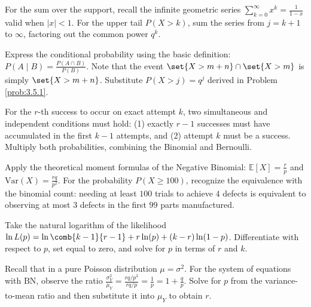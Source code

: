 \begin{sugerencia}
	\label{sug:3.5.1}
	For the sum over the support, recall the infinite geometric series $\sum_{k=0}^{\infty} x^k = \frac{1}{1-x}$ valid when $|x| < 1$. For the upper tail $P(X > k)$, sum the series from $j = k+1$ to $\infty$, factoring out the common power $q^k$.
\end{sugerencia}

\begin{sugerencia}
	\label{sug:3.5.2}
	Express the conditional probability using the basic definition: $P(A \mid B) = \frac{P(A \cap B)}{P(B)}$. Note that the event $\set{X > m+n} \cap \set{X > m}$ is simply $\set{X > m+n}$. Substitute $P(X > j) = q^j$ derived in Problem \ref{prob:3.5.1}.
\end{sugerencia}

\begin{sugerencia}
	\label{sug:3.5.3}
	For the $r$-th success to occur on exact attempt $k$, two simultaneous and independent conditions must hold: (1) exactly $r-1$ successes must have accumulated in the first $k-1$ attempts, and (2) attempt $k$ must be a success. Multiply both probabilities, combining the Binomial and Bernoulli.
\end{sugerencia}

\begin{sugerencia}
	\label{sug:3.5.4}
	Apply the theoretical moment formulas of the Negative Binomial: $\mathbb{E}[X] = \frac{r}{p}$ and $\text{Var}(X) = \frac{rq}{p^2}$. For the probability $P(X \ge 100)$, recognize the equivalence with the binomial count: needing at least $100$ trials to achieve $4$ defects is equivalent to observing at most $3$ defects in the first $99$ parts manufactured.
\end{sugerencia}

\begin{sugerencia}
	\label{sug:3.5.5}
	Take the natural logarithm of the likelihood $\ln L(p) = \ln \comb{k-1}{r-1} + r \ln(p) + (k-r)\ln(1-p)$. Differentiate with respect to $p$, set equal to zero, and solve for $p$ in terms of $r$ and $k$.
\end{sugerencia}

\begin{sugerencia}
	\label{sug:3.5.6}
	Recall that in a pure Poisson distribution $\mu = \sigma^2$. For the system of equations with $\text{BN}$, observe the ratio $\frac{\sigma_Y^2}{\mu_Y} = \frac{rq/p^2}{rq/p} = \frac{1}{p} = 1 + \frac{q}{p}$. Solve for $p$ from the variance-to-mean ratio and then substitute it into $\mu_Y$ to obtain $r$.
\end{sugerencia}

